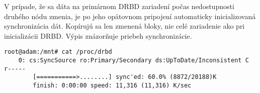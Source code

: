 V prípade, že sa dáta na primárnom DRBD zariadení počas nedostupnosti druhého nódu zmenia, je po jeho opätovnom pripojení automaticky inicializovaná synchronizácia dát. Kopírujú sa len zmenená bloky, nie celé zariadenie ako pri inicializácii DRBD. Výpis znázorňuje priebeh synchronizácie.
\begin{lstlisting}
root@adam:/mnt# cat /proc/drbd
	0: cs:SyncSource ro:Primary/Secondary ds:UpToDate/Inconsistent C r-----
        [===========>........] sync'ed: 60.0% (8872/20188)K
        finish: 0:00:00 speed: 11,316 (11,316) K/sec
\end{lstlisting}


\emptydoublepage
